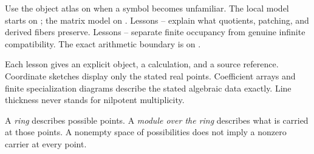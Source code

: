Use the object atlas on  when a symbol becomes unfamiliar. The local model starts on ; the matrix model on . Lessons -- explain what quotients, patching, and derived fibers preserve. Lessons -- separate finite occupancy from genuine infinite compatibility. The exact arithmetic boundary is on .

Each lesson gives an explicit object, a calculation, and a source reference. Coordinate sketches display only the stated real points. Coefficient arrays and finite specialization diagrams describe the stated algebraic data exactly. Line thickness never stands for nilpotent multiplicity.


A \emph{ring} describes possible points. A \emph{module over the ring} describes what is carried at those points. A nonempty space of possibilities does not imply a nonzero carrier at every point.

